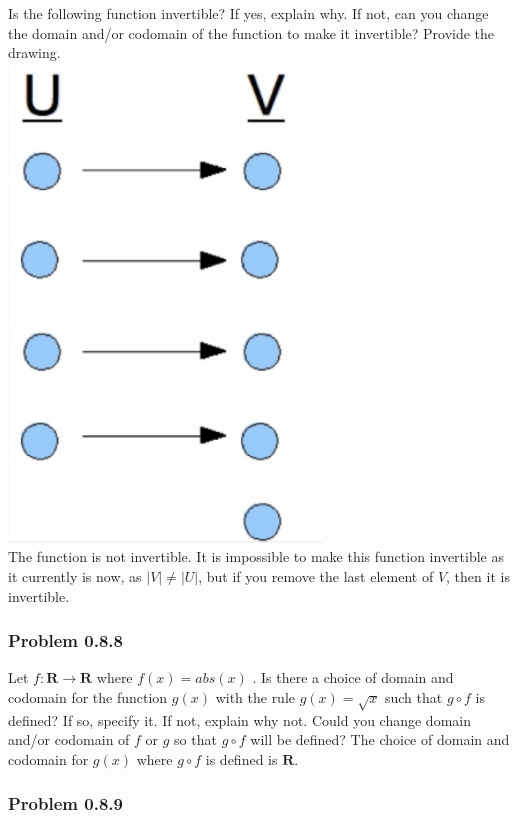 \documentclass[
  letterpaper,
  DIV=11,
  numbers=noendperiod]{scrartcl}
\begin{document}
Is the following function invertible? If yes, explain why. If not, can
you change the domain and/or codomain of the function to make it
invertible? Provide the drawing.\\
\includegraphics{images/image-1309870809.png}\\
The function is not invertible. It is impossible to make this function
invertible as it currently is now, as \(|V| \ne |U|\), but if you remove
the last element of \(V\), then it is invertible.

\hypertarget{problem-0.8.8}{%
\subsubsection{Problem 0.8.8}\label{problem-0.8.8}}

Let \(f : \mathbf{R} \rightarrow \mathbf{R}\) where \(f(x) = abs(x)\) .
Is there a choice of domain and codomain for the function \(g(x)\) with
the rule \(g(x) = \sqrt{x}\) such that \(g \circ f\) is defined? If so,
specify it. If not, explain why not. Could you change domain and/or
codomain of \(f\) or \(g\) so that \(g \circ f\) will be defined? The
choice of domain and codomain for \(g(x)\) where \(g \circ f\) is
defined is \(\mathbf{R}\).

\hypertarget{problem-0.8.9}{%
\subsubsection{Problem 0.8.9}\label{problem-0.8.9}}
\end{document}
